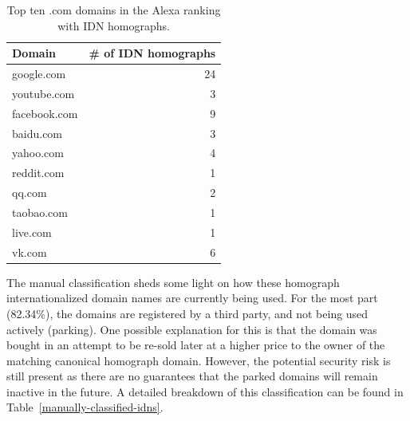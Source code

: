 \documentclass[letterpaper,twocolumn,10pt]{article}
\begin{document}
\begin{table}[ht!]
\centering
\begin{tabular}{lr}
\hline
Domain       & \# of IDN homographs \\ \hline
google.com   & 24                   \\
youtube.com  & 3                    \\
facebook.com & 9                    \\
baidu.com    & 3                    \\
yahoo.com    & 4                    \\
reddit.com   & 1                    \\
qq.com       & 2                    \\
taobao.com   & 1                    \\
live.com     & 1                    \\
vk.com       & 6                    \\ \hline
\end{tabular}
\caption{Top ten .com domains in the Alexa ranking with IDN homographs.}
\label{top-com-alexa-with-idns}
\end{table}

The manual classification sheds some light on how these homograph internationalized domain names are currently being used.
For the most part (82.34\%), the domains are registered by a third party, and not being used actively (parking).
One possible explanation for this is that the domain was bought in an attempt to be re-sold later at a higher price to the owner of the matching canonical homograph domain.
However, the potential security risk is still present as there are no guarantees that the parked domains will remain inactive in the future.
A detailed breakdown of this classification can be found in Table~\ref{manually-classified-idns}.
\end{document}
